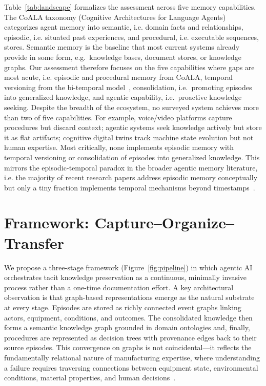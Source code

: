 \documentclass[]{ceurart}
\begin{document}
Table~\ref{tab:landscape} formalizes the assessment across five memory
capabilities. The CoALA taxonomy (Cognitive Architectures for Language
Agents)~\cite{sumers2024coala} categorizes agent memory into
semantic, i.e. domain facts and relationships, episodic, i.e. 
situated past experiences, and procedural, i.e. executable
sequences, stores. Semantic memory is the baseline that most current systems
already provide in some form, e.g.\ knowledge bases, document stores, or
knowledge graphs. Our assessment therefore focuses on the five
capabilities where gaps are most acute, i.e. episodic and
procedural memory from CoALA, temporal versioning from the
bi-temporal model~\cite{rasmussen2025}, consolidation, i.e.\
promoting episodes into generalized knowledge, and agentic
capability, i.e.\ proactive knowledge seeking. Despite the breadth of the
ecosystem, no surveyed system achieves more than two of five
capabilities. For example, voice/video platforms capture procedures but discard
context; agentic systems seek knowledge actively but store it as flat
artifacts; cognitive digital twins track machine state evolution but not
human expertise. Most critically, none implements episodic memory with
temporal versioning or consolidation of episodes into generalized
knowledge. This mirrors the episodic-temporal paradox in the
broader agentic memory literature, i.e. the majority of recent research papers
address episodic memory conceptually but only a tiny fraction implements temporal
mechanisms beyond timestamps~\cite{hu2025survey}.

\section{Framework: Capture--Organize--Transfer}\label{sec:framework}

We propose a three-stage framework (Figure~\ref{fig:pipeline}) in which
agentic AI orchestrates tacit knowledge preservation as a continuous,
minimally invasive process rather than a one-time documentation effort.
A key architectural observation is that graph-based
representations emerge as the natural substrate at every stage.
Episodes are stored as richly connected event graphs linking actors,
equipment, conditions, and outcomes. The consolidated knowledge then forms a
semantic knowledge graph grounded in domain ontologies and, finally, procedures
are represented as decision trees with provenance edges back to their
source episodes. This convergence on graphs is not coincidental---it
reflects the fundamentally relational nature of manufacturing
expertise, where understanding a failure requires traversing connections
between equipment state, environmental conditions, material properties,
and human decisions~\cite{graphmemsurvey2026}.
\end{document}
